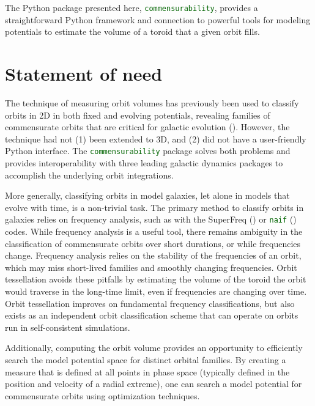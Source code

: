 \documentclass[12pt]{article}
\let\oldtexttt\texttt
\renewcommand{\texttt}[1]{\oldtexttt{\textcolor{darkgreen}{#1}}}
\begin{document}
The Python package presented here, \texttt{commensurability}, provides a
straightforward Python framework and connection to powerful tools for
modeling potentials to estimate the volume of a toroid that a given
orbit fills.

\section{Statement of need}\label{statement-of-need}

The technique of measuring orbit volumes has previously been used to
classify orbits in 2D in both fixed and evolving potentials, revealing
families of commensurate orbits that are critical for galactic evolution
().
However, the technique had not (1) been extended to 3D, and (2) did not
have a user-friendly Python interface. The \texttt{commensurability}
package solves both problems and provides interoperability with three
leading galactic dynamics packages to accomplish the underlying orbit
integrations.

More generally, classifying orbits in model galaxies, let alone in
models that evolve with time, is a non-trivial task. The primary method
to classify orbits in galaxies relies on frequency analysis, such as
with the SuperFreq ()
or \texttt{naif} () codes.
While frequency analysis is a useful tool, there remains ambiguity in
the classification of commensurate orbits over short durations, or while
frequencies change. Frequency analysis relies on the stability of the
frequencies of an orbit, which may miss short-lived families and
smoothly changing frequencies. Orbit tessellation avoids these pitfalls
by estimating the volume of the toroid the orbit would traverse in the
long-time limit, even if frequencies are changing over time. Orbit
tessellation improves on fundamental frequency classifications, but also
exists as an independent orbit classification scheme that can operate on
orbits run in self-consistent simulations.

Additionally, computing the orbit volume provides an opportunity to
efficiently search the model potential space for distinct orbital
families. By creating a measure that is defined at all points in phase
space (typically defined in the position and velocity of a radial
extreme), one can search a model potential for commensurate orbits using
optimization techniques.
\end{document}
